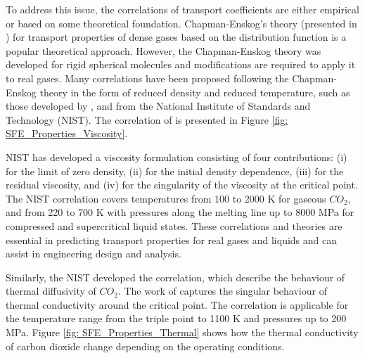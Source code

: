 \documentclass[../Article_Sensitivity_Analsysis.tex]{subfiles}
\begin{document}
	To address this issue, the correlations of transport coefficients are either empirical or based on some theoretical foundation. Chapman-Enskog's theory (presented in \citet{Chapman1991}) for transport properties of dense gases based on the distribution function is a popular theoretical approach. However, the Chapman-Enskog theory was developed for rigid spherical molecules and modifications are required to apply it to real gases. Many correlations have been proposed following the Chapman-Enskog theory in the form of reduced density and reduced temperature, such as those developed by \citet{Fenghour1998}, and \citet{Laesecke2017} from the National Institute of Standards and Technology (NIST). The correlation of \citet{Laesecke2017} is presented in Figure \ref{fig: SFE_Properties_Viscosity}.
	
	NIST has developed a viscosity formulation consisting of four contributions: (i) for the limit of zero density, (ii) for the initial density dependence, (iii) for the residual viscosity, and (iv) for the singularity of the viscosity at the critical point. The NIST correlation covers temperatures from 100 to 2000 K for gaseous $CO_2$, and from 220 to 700 K with pressures along the melting line up to 8000 MPa for compressed and supercritical liquid states. These correlations and theories are essential in predicting transport properties for real gases and liquids and can assist in engineering design and analysis.
	
	
	Similarly, the NIST developed the correlation, which describe the behaviour of thermal diffusivity of $CO_2$. The work of \citet{Huber2016} captures the singular behaviour of thermal conductivity around the critical point. The correlation is applicable for the temperature range from the triple point to 1100 K and pressures up to 200 MPa. Figure \ref{fig: SFE_Properties_Thermal} shows how the thermal conductivity of carbon dioxide change depending on the operating conditions.
	
\end{document}
